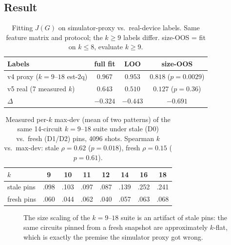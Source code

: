 \documentclass[journal,10pt,twocolumn]{IEEEtran}
\begin{document}
\subsection{Result}
\begin{table}[t]
\caption{Fitting $J(G)$ on simulator-proxy vs.\ real-device labels. Same feature matrix and protocol; the $k{\ge}9$
labels differ. size-OOS = fit on $k\le8$, evaluate $k\ge9$.}
\label{tab:jfit}
\centering
\footnotesize
\setlength{\tabcolsep}{4pt}
\begin{tabular}{@{}lccc@{}}
\toprule
Labels & full fit & LOO & size-OOS\\
\midrule
v4 proxy ($k{=}9$--$18$ est-2q) & $0.967$ & $0.953$ & $0.818$ ($p{=}0.0029$)\\
v5 real (7 measured $k$) & $0.643$ & $0.510$ & $0.127$ ($p{=}0.36$)\\
\midrule
$\Delta$ & $-0.324$ & $-0.443$ & $-0.691$\\
\bottomrule
\end{tabular}
\end{table}

\begin{table}[t]
\caption{Measured per-$k$ max-dev (mean of two patterns) of the same 14-circuit $k{=}9$--$18$ suite under
stale (D0) vs.\ fresh (D1/D2) pins, 4096 shots. Spearman $k$ vs.\ max-dev: stale $\rho{=}0.62$
($p{=}0.018$), fresh $\rho{=}0.15$ ($p{=}0.61$).}
\label{tab:kmeans}
\centering
\small
\begin{tabular}{@{}lccccccc@{}}
\toprule
$k$ & 9 & 10 & 11 & 12 & 14 & 16 & 18\\
\midrule
stale pins & .098 & .103 & .097 & .087 & .139 & .252 & .241\\
fresh pins & .060 & .044 & .062 & .040 & .057 & .063 & .068\\
\bottomrule
\end{tabular}
\end{table}

\begin{figure}[t]
\centering
{}
\caption{The size scaling of the $k{=}9$--$18$ suite is an artifact of stale pins: the same circuits pinned from a
fresh snapshot are approximately $k$-flat, which is exactly the premise the simulator proxy got wrong.}
\label{fig:perkv}
\end{figure}
\end{document}

